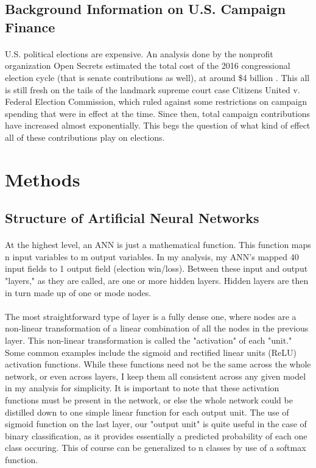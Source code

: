 \documentclass[11pt]{scrartcl} %
\begin{document}
\subsection{Background Information on U.S. Campaign Finance}
\paragraph{}
U.S. political elections are expensive. An analysis done by the nonprofit organization Open Secrets estimated the total cost of the 2016 congressional election cycle (that is senate contributions as well), at around \$4 billion \cite{opensecretsarticle}. This all is still fresh on the tails of the landmark supreme court case Citizens United v. Federal Election Commission, which ruled against some restrictions on campaign spending that were in effect at the time. Since then, total campaign contributions have increased almost exponentially. This begs the question of what kind of effect all of these contributions play on elections.


\section{Methods}

\subsection{Structure of Artificial Neural Networks}
\paragraph{}
At the highest level, an ANN is just a mathematical function. This function maps n input variables to m output variables. In my analysis, my ANN's mapped 40 input fields to 1 output field (election win/loss). Between these input and output "layers," as they are called, are one or more hidden layers. Hidden layers are then in turn made up of one or mode nodes.

\paragraph{}
The most straightforward type of layer is a fully dense one, where nodes are a non-linear transformation of a linear combination of all the nodes in the previous layer. This non-linear transformation is called the "activation" of each "unit." Some common examples include the sigmoid and rectified linear units (ReLU) activation functions. While these functions need not be the same across the whole network, or even across layers, I keep them all consistent across any given model in my analysis for simplicity. It is important to note that these activation functions must be present in the network, or else the whole network could be distilled down to one simple linear function for each output unit. The use of sigmoid function on the last layer, our "output unit" is quite useful in the case of binary classification, as it provides essentially a predicted probability of each one class occuring. This of course can be generalized to n classes by use of a softmax function.
\end{document}
